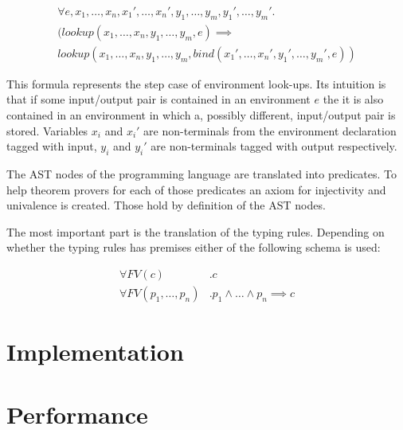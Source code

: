 \begin{multline}
  \forall e, x_1, \dots, x_n, x_1', \dots, x_n', y_1, \dots, y_m, y_1', \dots,
  y_m' . \\
  (lookup(x_1, \dots, x_n, y_1, \dots, y_m, e) \implies \\ lookup(x_1,
  \dots, x_n, y_1, \dots, y_m, bind(x_1',\dots,x_n',y_1',\dots,y_m',e))
\end{multline}

This formula represents the step case of environment look-ups. Its
intuition is that if some input/output pair is contained in an
environment $e$ the it is also contained in an environment in which a,
possibly different, input/output pair is stored. Variables $x_i$ and
$x_i'$ are non-terminals from the environment declaration tagged with
input, $y_i$ and $y_i'$ are non-terminals tagged with output
respectively.

The AST nodes of the programming language are translated into
predicates. To help theorem provers for each of those predicates an
axiom for injectivity and univalence is created. Those hold by
definition of the AST nodes.

The most important part is the translation of the typing
rules. Depending on whether the typing rules has premises either of
the following schema is used:

\begin{align}
  \forall FV(c) &. c \\
  \forall FV(p_1,\dots, p_n) &. p_1 \land \dots \land p_n \implies c
\end{align}



\section{Implementation}
\section{Performance}
